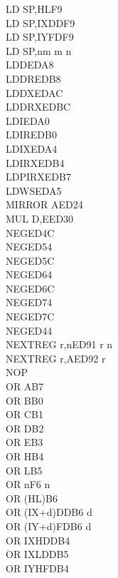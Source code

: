 \begin{multicols}{3}
{\begin{tabbing}
        LD SP,HL\>F9\\
        LD SP,IX\>DDF9\\
        LD SP,IY\>FDF9\\
        LD SP,nm m n\\
        LDD\>EDA8\\
        LDDR\>EDB8\\
        LDDX\ZXN\>EDAC\\
        LDDRX\ZXN\>EDBC\\
        LDI\>EDA0\\
        LDIR\>EDB0\\
        LDIX\ZXN\>EDA4\\
        LDIRX\ZXN\>EDB4\\
        LDPIRX\ZXN\>EDB7\\
        LDWS\ZXN\>EDA5\\
        MIRROR A\ZXN\>ED24\\
        MUL D,E\ZXN\>ED30\\
        NEG\UNDOC\>ED4C\\
        NEG\UNDOC\>ED54\\
        NEG\UNDOC\>ED5C\\
        NEG\UNDOC\>ED64\\
        NEG\UNDOC\>ED6C\\
        NEG\UNDOC\>ED74\\
        NEG\UNDOC\>ED7C\\
        NEG\>ED44\\
        NEXTREG r,n\ZXN\>ED91 r n\\
        NEXTREG r,A\ZXN\>ED92 r\\
        NOP\\
        OR A\>B7\\
        OR B\>B0\\
        OR C\>B1\\
        OR D\>B2\\
        OR E\>B3\\
        OR H\>B4\\
        OR L\>B5\\
        OR n\>F6 n\\
        OR (HL)\>B6\\
        OR (IX+d)\>DDB6 d\\
        OR (IY+d)\>FDB6 d\\
        OR IXH\UNDOC\>DDB4\\
        OR IXL\UNDOC\>DDB5\\
        OR IYH\UNDOC\>FDB4\\

\end{tabbing}}
\end{multicols}

